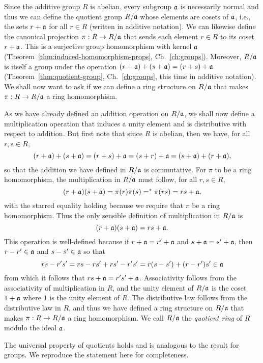 Since the additive group \(R\) is abelian, every subgroup \(\mathfrak{a}\) is
necessarily normal and thus we can define the quotient group \(R/\mathfrak{a}\) whose
elements are cosets of \(\mathfrak{a}\), i.e., the sets \(r + \mathfrak{a}\) for all \(r
\in R\) (written in additive notation). We can likewise define the canonical
projection \(\pi: R \to R/\mathfrak{a}\) that sends each element \(r \in R\) to its
coset \(r + \mathfrak{a}\). This is a surjective group homomorphism with kernel
\(\mathfrak{a}\) (Theorem~\ref{thm:induced-homomorphism-props}, Ch.~\ref{ch:groups}).
Moreover, \(R/\mathfrak{a}\) is itself a group under the operation \((r + \mathfrak{a}) +
(s + \mathfrak{a}) = (r + s) + \mathfrak{a}\) (Theorem~\ref{thm:quotient-group},
Ch.~\ref{ch:groups}, this time in additive notation). We shall now want to ask
if we can define a ring structure on \(R/\mathfrak{a}\) that makes \(\pi: R \to
R/\mathfrak{a}\) a ring homomorphism.

As we have already defined an addition operation on \(R/\mathfrak{a}\), we shall now
define a multiplication operation that induces a unity element and is
distributive with respect to addition. But first note that since \(R\) is
abelian, then we have, for all \(r, s \in R\),
\[
    (r + \mathfrak{a})+(s + \mathfrak{a}) = (r + s) + \mathfrak{a} = (s + r) + \mathfrak{a} = (s + \mathfrak{a})+(r + \mathfrak{a}),
\]
so that the addition we have defined in \(R/\mathfrak{a}\) is commutative. For
\(\pi\) to be a ring homomorphism, the multiplication in \(R/\mathfrak{a}\) must
follow, for all \(r, s \in R\),
\[
    (r + \mathfrak{a})(s + \mathfrak{a}) = \pi(r)\pi(s) =^* \pi(rs) = rs + \mathfrak{a},
\]
with the starred equality holding because we require that \(\pi\) be a ring
homomorphism. Thus the only sensible definition of multiplication in
\(R/\mathfrak{a}\) is
\[
    (r + \mathfrak{a})(s + \mathfrak{a}) = rs + \mathfrak{a}.
\]
This operation is well-defined because if \(r + \mathfrak{a} = r' + \mathfrak{a}\) and \(s
+ \mathfrak{a} = s' + \mathfrak{a}\), then \(r - r' \in \mathfrak{a}\) and \(s - s' \in
\mathfrak{a}\) so that
\[
    rs - r's' = rs - rs' + rs' - r's' = r(s - s') + (r - r')s' \in \mathfrak{a}
\]
from which it follows that \(rs + \mathfrak{a} = r's' + \mathfrak{a}\). Associativity
follows from the associativity of multiplication in \(R\), and the unity element
of \(R/\mathfrak{a}\) is the coset \(1 + \mathfrak{a}\) where \(1\) is the unity element
of \(R\). The distributive law follows from the distributive law in \(R\), and
thus we have defined a ring structure on \(R/\mathfrak{a}\) that makes \(\pi: R \to
R/\mathfrak{a}\) a ring homomorphism. We call \(R/\mathfrak{a}\) the \emph{quotient ring}
of \(R\) modulo the ideal \(\mathfrak{a}\).

The universal property of quotients holds and is analogous to the result for
groups. We reproduce the statement here for completeness.


